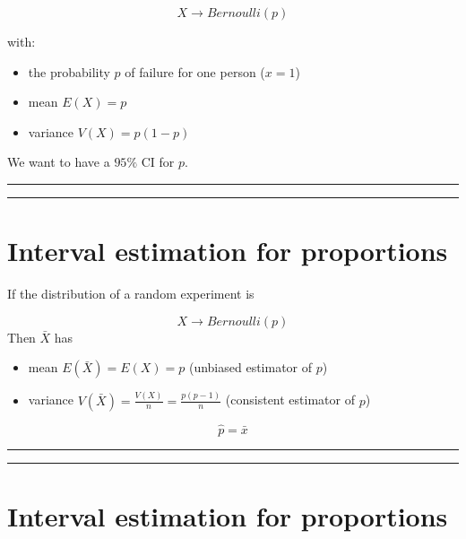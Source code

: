 \documentclass[
]{book}
\providecommand{\tightlist}{%
  \setlength{\itemsep}{0pt}\setlength{\parskip}{0pt}}
\begin{document}
\[X \rightarrow Bernoulli(p)\]

with:

\begin{itemize}
\tightlist
\item
  the probability \(p\) of failure for one person (\(x=1\))
\item
  mean \(E (X) = p\)
\item
  variance \(V (X) = p (1-p)\)
\end{itemize}

We want to have a \(95\%\) CI for \(p\).

\begin{center}\rule{0.5\linewidth}{0.5pt}\end{center}

\begin{center}\rule{0.5\linewidth}{0.5pt}\end{center}

\hypertarget{interval-estimation-for-proportions-1}{%
\section{Interval estimation for proportions}\label{interval-estimation-for-proportions-1}}

If the distribution of a random experiment is

\[X \rightarrow Bernoulli (p)\]
Then \(\bar{X}\) has

\begin{itemize}
\tightlist
\item
  mean \(E(\bar{X})=E(X)=p\) (unbiased estimator of \(p\))\\
\item
  variance \(V(\bar{X})=\frac{V(X)}{n}=\frac{p(p-1)}{n}\) (consistent estimator of \(p\))
\end{itemize}

\[\hat{p}=\bar{x}\]

\begin{center}\rule{0.5\linewidth}{0.5pt}\end{center}

\begin{center}\rule{0.5\linewidth}{0.5pt}\end{center}

\hypertarget{interval-estimation-for-proportions-2}{%
\section{Interval estimation for proportions}\label{interval-estimation-for-proportions-2}}
\end{document}
